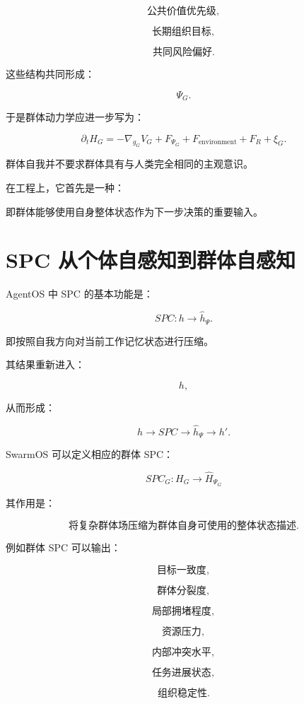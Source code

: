 \[
\text{公共价值优先级},
\]

\[
\text{长期组织目标},
\]

\[
\text{共同风险偏好}.
\]

这些结构共同形成：

\[
\Psi_G.
\]

于是群体动力学应进一步写为：

\[
\partial_t H_G
=
-\nabla_{g_G}V_G
+
F_{\Psi_G}
+
F_{\mathrm{environment}}
+
F_R
+
\xi_G.
\]

群体自我并不要求群体具有与人类完全相同的主观意识。

在工程上，它首先是一种：

\begin{statementbox}
\centering
{}
\end{statementbox}

即群体能够使用自身整体状态作为下一步决策的重要输入。


\section{SPC 从个体自感知到群体自感知}

AgentOS 中 SPC 的基本功能是：

\[
SPC:
h
\rightarrow
\hat h_{\Psi}.
\]

即按照自我方向对当前工作记忆状态进行压缩。

其结果重新进入：

\[
h,
\]

从而形成：

\[
h
\rightarrow
SPC
\rightarrow
\hat h_{\Psi}
\rightarrow
h'.
\]

SwarmOS 可以定义相应的群体 SPC：

\[
\boxed{
SPC_G:
H_G
\rightarrow
\hat H_{\Psi_G}
}
\]

其作用是：

\[
\text{将复杂群体场压缩为群体自身可使用的整体状态描述}.
\]

例如群体 SPC 可以输出：

\[
\text{目标一致度},
\]

\[
\text{群体分裂度},
\]

\[
\text{局部拥堵程度},
\]

\[
\text{资源压力},
\]

\[
\text{内部冲突水平},
\]

\[
\text{任务进展状态},
\]

\[
\text{组织稳定性}.
\]

